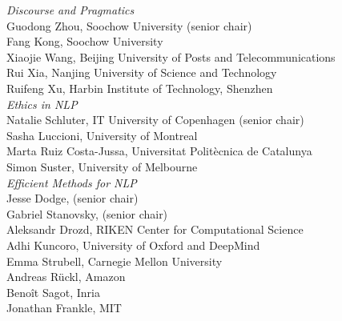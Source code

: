 \emph{Discourse and Pragmatics} \\
\hspace*{0.2in} Guodong Zhou, Soochow University (senior chair)\\
\hspace*{0.2in} Fang Kong, Soochow University\\
\hspace*{0.2in} Xiaojie Wang, Beijing University of Posts and Telecommunications\\
\hspace*{0.2in} Rui Xia, Nanjing University of Science and Technology\\
\hspace*{0.2in} Ruifeng Xu, Harbin Institute of Technology, Shenzhen\\

\emph{Ethics in NLP} \\
\hspace*{0.2in} Natalie Schluter, IT University of Copenhagen (senior chair)\\
\hspace*{0.2in} Sasha Luccioni, University of Montreal \\
\hspace*{0.2in} Marta Ruiz Costa-Jussa, Universitat Politècnica de Catalunya\\
\hspace*{0.2in} Simon Suster, University of Melbourne\\

\emph{Efficient Methods for NLP} \\
\hspace*{0.2in} Jesse Dodge, (senior chair)\\
\hspace*{0.2in} Gabriel Stanovsky, (senior chair)\\
\hspace*{0.2in} Aleksandr Drozd, RIKEN Center for Computational Science\\
\hspace*{0.2in} Adhi Kuncoro, University of Oxford and DeepMind\\
\hspace*{0.2in} Emma Strubell, Carnegie Mellon University\\
\hspace*{0.2in} Andreas Rückl, Amazon\\
\hspace*{0.2in} Benoît Sagot, Inria\\
\hspace*{0.2in} Jonathan Frankle, MIT\\

